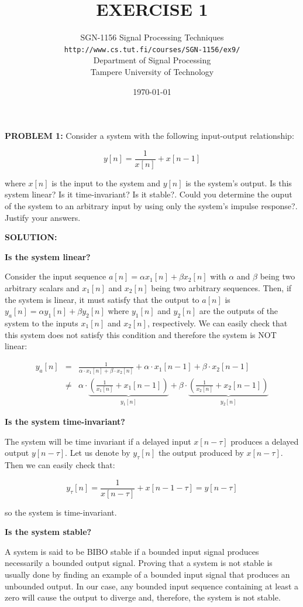 \documentclass[11pt]{article}
\title{\large{\textbf{EXERCISE 1}}}
\author{SGN-1156 Signal Processing Techniques\\
\texttt{http://www.cs.tut.fi/courses/SGN-1156/ex9/}\\
Department of Signal Processing\\
Tampere University of Technology}
\date{\today}
\begin{document}
\maketitle


\textbf{PROBLEM 1:}  Consider a system with the following input-output relationship:

\[
y[n] = \frac{1}{x[n]}+x[n-1]
\]

where $x[n]$ is the input to the system and $y[n]$ is the system's output. Is this system linear? Is it time-invariant? Is it stable?. Could you determine the ouput of the system to an arbitrary input by using only the system's impulse response?. Justify your answers. 

\vspace{1cm}

\textbf{SOLUTION:}

\textbf{Is the system linear?}

Consider the input sequence $a[n]=\alpha x_1[n]+\beta x_2[n]$ with $\alpha$ and $\beta$ being two arbitrary scalars and $x_1[n]$ and $x_2[n]$ being two arbitrary sequences. Then, if the system is linear, it must satisfy that the output to $a[n]$ is $y_a[n]=\alpha y_1[n] + \beta y_2[n]$ where $y_1[n]$ and $y_2[n]$ are the outputs of the system to the inputs $x_1[n]$ and $x_2[n]$, respectively. We can easily check that this system does not satisfy this condition and therefore the system is NOT linear:

\[
\begin{array}{lll}
y_a[n]&=&\frac{1}{\alpha\cdot x_1[n]+\beta\cdot x_2[n]}+\alpha\cdot x_1[n-1]+\beta\cdot x_2[n-1]\\ &\neq&\alpha\cdot\underbrace{\left(\frac{1}{x_1[n]}+x_1[n-1]\right)}_{y_1[n]}+\beta\cdot\underbrace{\left(\frac{1}{x_2[n]}+x_2[n-1]\right)}_{y_2[n]}
\end{array}
\]

\textbf{Is the system time-invariant?}

The system will be time invariant if a delayed input $x[n-\tau]$ produces a delayed output $y[n-\tau]$. Let us denote by $y_\tau[n]$ the output produced by $x[n-\tau]$. Then we can easily check that:

\[
y_\tau[n] = \frac{1}{x[n-\tau]}+x[n-1-\tau] =y[n-\tau]
\]

so the system is time-invariant.


\textbf{Is the system stable?}

A system is said to be BIBO stable if a bounded input signal produces necessarily a bounded output signal. Proving that a system is not stable is usually done by finding an example of a bounded input signal that produces an unbounded output. In our case, any bounded input sequence containing at least a zero will cause the output to diverge and, therefore, the system is not stable.
\end{document}
